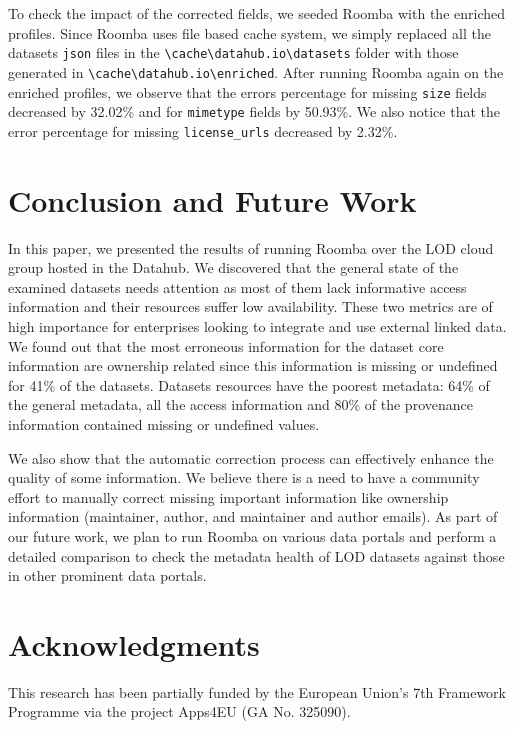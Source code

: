 \documentclass[runningheads,a4paper]{../../Tools/LaTEX/llncs}
\begin{document}
To check the impact of the corrected fields, we seeded Roomba with the enriched profiles. Since Roomba uses file based cache system, we simply replaced all the datasets \texttt{json} files in the \texttt{\textbackslash cache\textbackslash datahub.io\textbackslash datasets} folder with those generated in \texttt{\textbackslash cache\textbackslash datahub.io\textbackslash enriched}. After running Roomba again on the enriched profiles, we observe that the errors percentage for missing \texttt{size} fields decreased by 32.02\% and for \texttt{mimetype} fields by 50.93\%. We also notice that the error percentage for missing \texttt{license\_urls} decreased by 2.32\%.


\section{Conclusion and Future Work}
\label{sec:conclusion}
In this paper, we presented the results of running Roomba over the LOD cloud group hosted in the Datahub. We discovered that the general state of the examined datasets needs attention as most of them lack informative access information and their resources suffer low availability. These two metrics are of high importance for enterprises looking to integrate and use external linked data. We found out that the most erroneous information for the dataset core information are ownership related since this information is missing or undefined for 41\% of the datasets. Datasets resources have the poorest metadata: 64\% of the general metadata, all the access information and 80\% of the provenance information contained missing or undefined values.

We also show that the automatic correction process can effectively enhance the quality of some information. We believe there is a need to have a community effort to manually correct missing important information like ownership information (maintainer, author, and maintainer and author emails). As part of our future work, we plan to run Roomba on various data portals and perform a detailed comparison to check the metadata health of LOD datasets against those in other prominent data portals.


\section*{Acknowledgments}
This research has been partially funded by the European Union's 7th Framework Programme via the project Apps4EU (GA No. 325090).



\end{document}
